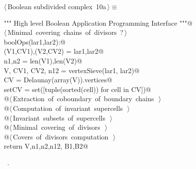 \documentclass[11pt,oneside]{article}	%
\begin{document}
\begin{flushleft} \small \label{scrap16}
\protect{}$\langle\,$Boolean subdivided complex\nobreak\ {\footnotesize 10a}$\,\rangle\equiv$
\vspace{-1ex}
\begin{list}{}{} \item
\mbox{}\verb@""" High level Boolean Application Programming Interface """@\\
\mbox{}\verb@@\hbox{$\langle\,$Minimal covering chains of divisors\nobreak\ {\footnotesize ?}$\,\rangle$}\verb@@\\
\mbox{}\verb@def boolOps(lar1,lar2):@\\
\mbox{}\verb@   (V1,CV1),(V2,CV2) = lar1,lar2@\\
\mbox{}\verb@   n1,n2 = len(V1),len(V2)@\\
\mbox{}\verb@   V, CV1, CV2, n12 = vertexSieve(lar1, lar2)@\\
\mbox{}\verb@   CV = Delaunay(array(V)).vertices@\\
\mbox{}\verb@   setCV = set([tuple(sorted(cell)) for cell in CV])@\\
\mbox{}\verb@   @\hbox{$\langle\,$Extraction of coboundary of boundary chains\nobreak\ {\footnotesize {}}$\,\rangle$}\verb@@\\
\mbox{}\verb@   @\hbox{$\langle\,$Computation of invariant supercells\nobreak\ {\footnotesize {}}$\,\rangle$}\verb@@\\
\mbox{}\verb@   @\hbox{$\langle\,$Invariant subsets of supercells\nobreak\ {\footnotesize {}}$\,\rangle$}\verb@@\\
\mbox{}\verb@   @\hbox{$\langle\,$Minimal covering of divisors\nobreak\ {\footnotesize {}}$\,\rangle$}\verb@@\\
\mbox{}\verb@   @\hbox{$\langle\,$Covers of divisors computation\nobreak\ {\footnotesize {}}$\,\rangle$}\verb@@\\
\mbox{}\verb@   return V,n1,n2,n12, B1,B2@\\
\mbox{}\verb@@{\NWsep}
\end{list}
\vspace{-1ex}
\footnotesize\addtolength{\baselineskip}{-1ex}
\begin{list}{}{\setlength{\itemsep}{-\parsep}\setlength{\itemindent}{-\leftmargin}}
\item \NWtxtMacroRefIn\ .
\end{list}
\end{flushleft}
\end{document}
